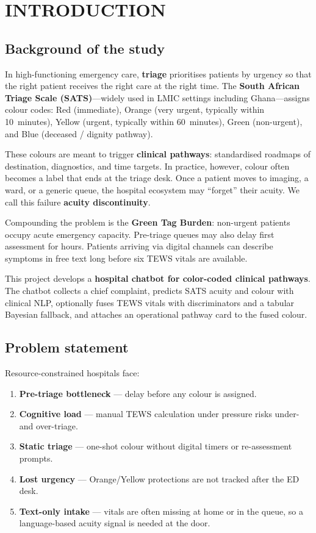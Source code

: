 \chapter{INTRODUCTION}
\label{ch:intro}

\section{Background of the study}

In high-functioning emergency care, \textbf{triage} prioritises patients by urgency so that the right patient receives the right care at the right time. The \textbf{South African Triage Scale (SATS)}---widely used in LMIC settings including Ghana---assigns colour codes: Red (immediate), Orange (very urgent, typically within 10~minutes), Yellow (urgent, typically within 60~minutes), Green (non-urgent), and Blue (deceased / dignity pathway).

These colours are meant to trigger \textbf{clinical pathways}: standardised roadmaps of destination, diagnostics, and time targets. In practice, however, colour often becomes a label that ends at the triage desk. Once a patient moves to imaging, a ward, or a generic queue, the hospital ecosystem may ``forget'' their acuity. We call this failure \textbf{acuity discontinuity}.

Compounding the problem is the \textbf{Green Tag Burden}: non-urgent patients occupy acute emergency capacity. Pre-triage queues may also delay first assessment for hours. Patients arriving via digital channels can describe symptoms in free text long before six TEWS vitals are available.

This project develops a \textbf{hospital chatbot for color-coded clinical pathways}. The chatbot collects a chief complaint, predicts SATS acuity and colour with clinical NLP, optionally fuses TEWS vitals with discriminators and a tabular Bayesian fallback, and attaches an operational pathway card to the fused colour.

\section{Problem statement}

Resource-constrained hospitals face:

\begin{enumerate}
  \item \textbf{Pre-triage bottleneck} --- delay before any colour is assigned.
  \item \textbf{Cognitive load} --- manual TEWS calculation under pressure risks under- and over-triage.
  \item \textbf{Static triage} --- one-shot colour without digital timers or re-assessment prompts.
  \item \textbf{Lost urgency} --- Orange/Yellow protections are not tracked after the ED desk.
  \item \textbf{Text-only intake} --- vitals are often missing at home or in the queue, so a language-based acuity signal is needed at the door.
\end{enumerate}


